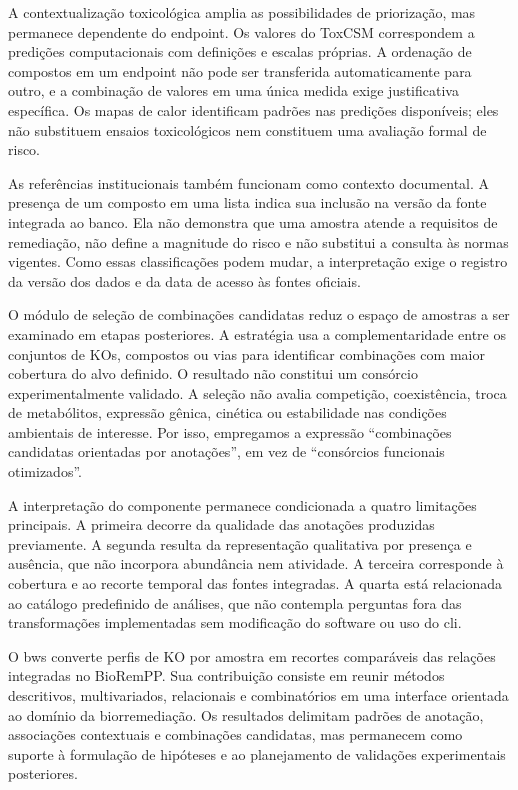 A contextualização toxicológica amplia as possibilidades de priorização, mas
permanece dependente do endpoint. Os valores do ToxCSM correspondem a
predições computacionais com definições e escalas próprias. A ordenação de
compostos em um endpoint não pode ser transferida automaticamente para outro,
e a combinação de valores em uma única medida exige justificativa específica.
Os mapas de calor identificam padrões nas predições disponíveis; eles não
substituem ensaios toxicológicos nem constituem uma avaliação formal de risco.

As referências institucionais também funcionam como contexto documental. A
presença de um composto em uma lista indica sua inclusão na versão da fonte
integrada ao banco. Ela não demonstra que uma amostra atende a requisitos de
remediação, não define a magnitude do risco e não substitui a consulta às
normas vigentes. Como essas classificações podem mudar, a interpretação exige
o registro da versão dos dados e da data de acesso às fontes oficiais.

O módulo de seleção de combinações candidatas reduz o espaço de amostras a ser
examinado em etapas posteriores. A estratégia usa a complementaridade entre os
conjuntos de KOs, compostos ou vias para identificar combinações com maior
cobertura do alvo definido. O resultado não constitui um consórcio
experimentalmente validado. A seleção não avalia competição, coexistência,
troca de metabólitos, expressão gênica, cinética ou estabilidade nas condições
ambientais de interesse. Por isso, empregamos a expressão ``combinações
candidatas orientadas por anotações'', em vez de ``consórcios funcionais
otimizados''.

A interpretação do componente permanece condicionada a quatro limitações
principais. A primeira decorre da qualidade das anotações produzidas previamente. A segunda resulta da representação qualitativa por presença e
ausência, que não incorpora abundância nem atividade. A terceira corresponde
à cobertura e ao recorte temporal das fontes integradas. A quarta está
relacionada ao catálogo predefinido de análises, que não contempla perguntas
fora das transformações implementadas sem modificação do software ou uso do
\gls{cli}.


O \gls{bws} converte perfis de KO por amostra em recortes comparáveis das
relações integradas no BioRemPP. Sua contribuição consiste em reunir métodos
descritivos, multivariados, relacionais e combinatórios em uma interface
orientada ao domínio da biorremediação. Os resultados delimitam padrões de
anotação, associações contextuais e combinações candidatas, mas permanecem
como suporte à formulação de hipóteses e ao planejamento de validações
experimentais posteriores.

